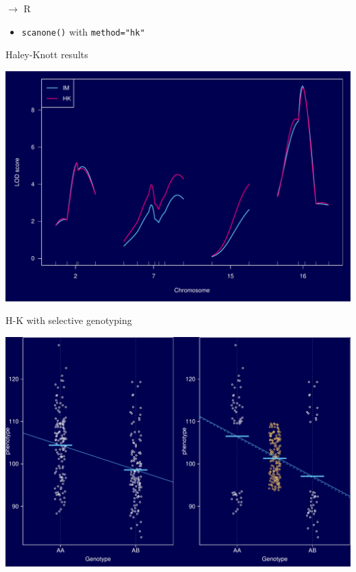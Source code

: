 \documentclass[12pt]{article}
\newcommand{\headsize}{\fontsize{35}{35} \selectfont}
\newcommand{\smallsize}{\fontsize{25}{30} \selectfont}
\begin{document}
\newpage

\headsize \color{myyellow}
$\boldsymbol{\rightarrow}$ R

\vspace{3cm}

\color{mywhite} \smallsize

\hfill \begin{minipage}[t]{9.5in}
\begin{itemize}
\itemsep24pt
\item \verb|scanone()| with \verb|method="hk"|
\end{itemize} \end{minipage}



\newpage

\headsize \color{myyellow}
\hfill \begin{minipage}{5.75in}
\centering
Haley-Knott results
\end{minipage}

\vfill

\centerline{\includegraphics{Figs/hk_lod.pdf}}



\newpage

\headsize \color{myyellow}
\hfill \begin{minipage}{5.75in}
\centering
H-K with selective genotyping
\end{minipage}

\vfill

\centerline{\includegraphics{Figs/hk_selgeno.pdf}}
\end{document}
